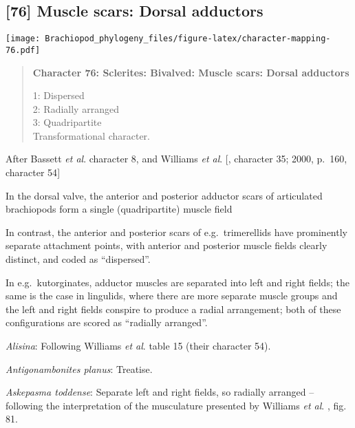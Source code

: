 \documentclass[openany]{book}
\theoremstyle{definition}
\theoremstyle{definition}
\theoremstyle{definition}
\theoremstyle{remark}
\begin{document}
\subsection*{{[}76{]} Muscle scars: Dorsal
adductors}\label{muscle-scars-dorsal-adductors}

\texttt{[image: Brachiopod\_phylogeny\_files/figure-latex/character-mapping-76.pdf]}

\begin{quote}
\textbf{Character 76: Sclerites: Bivalved: Muscle scars: Dorsal
adductors}

1: Dispersed\\
2: Radially arranged\\
3: Quadripartite\\
Transformational character.
\end{quote}

After Bassett \emph{et al}.
\citeyearpar{Bassett2001Functionalmorphology} character 8, and Williams
\emph{et al}. {[}\citet{Williams1996Asupra}, character 35; 2000, p.~160,
character 54{]}

In the dorsal valve, the anterior and posterior adductor scars of
articulated brachiopods form a single (quadripartite) muscle field
\citep[p.~201]{Williams2000LinguliformeaCraniiformea}

In contrast, the anterior and posterior scars of e.g.~trimerellids have
prominently separate attachment points, with anterior and posterior
muscle fields clearly distinct, and coded as ``dispersed''.

In e.g.~kutorginates, adductor muscles are separated into left and right
fields; the same is the case in lingulids, where there are more separate
muscle groups and the left and right fields conspire to produce a radial
arrangement; both of these configurations are scored as ``radially
arranged''.

\hypertarget{Alisina-coding-76}{}
\emph{Alisina}: Following Williams \emph{et al}.
\citeyearpar{Williams2000LinguliformeaCraniiformea} table 15 (their
character 54).

\hypertarget{Antigonambonites_planus-coding-76}{}
\emph{Antigonambonites planus}: Treatise.

\hypertarget{Askepasma_toddense-coding-76}{}
\emph{Askepasma toddense}: Separate left and right fields, so radially
arranged -- following the interpretation of the musculature presented by
Williams \emph{et al}.
\citeyearpar{Williams2000LinguliformeaCraniiformea}, fig. 81.
\end{document}
